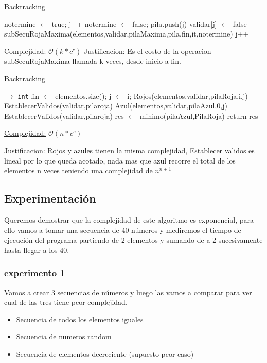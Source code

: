 \begin{algorithm}[H]
\caption{Backtracking}
\begin{algorithmic}[1]
    \State
    \State notermine $\gets$ true;
    \State {}
    \State j++
    \EndWhile
    \State {}
	\State	notermine $\gets$ false;
	\EndIf
    \State {}
    \State pila.push(j)
    \State validar[j] $\gets$ false
    \State subSecuRojaMaxima(elementos,validar,pilaMaxima,pila,fin,it,notermine)
    \State j++
    \EndWhile
\end{algorithmic}
\underline{Complejidad:} $\mathcal{O}(k*c^c)$
\underline{Justificacion:} Es el costo de la operacion subSecuRojaMaxima llamada k veces, desde inicio a fin.
\end{algorithm}



\begin{algorithm}[H]
\caption{Backtracking}
\begin{algorithmic}[1]
   $\to $ \texttt{int}
    \State fin $\gets$ elementos.size();
    \State j $\gets$ i;
    \State {}
    \State Rojos(elementos,validar,pilaRoja,i,j)
    \State EstablecerValidos(validar,pilaroja)
    \State Azul(elementos,validar,pilaAzul,0,j)
    \State EstablecerValidos(validar,pilaroja)
	\State	res $\gets$ minimo(pilaAzul,PilaRoja)
	\EndWhile
	\EndFor
\State return res
\end{algorithmic}
\underline{Complejidad:} $\mathcal{O}(n*c^c)$
\end{algorithm}
\underline{Justificacion:} Rojos y azules tienen la misma complejidad, Establecer validos es lineal por lo que queda acotado, nada mas que azul recorre el total de los elementos n veces teniendo una complejidad de $n^{n+1}$
\subsection{Experimentación}


Queremos demostrar que la complejidad de este algoritmo es exponencial, para ello vamos a tomar una secuencia de 40 números y mediremos el tiempo
de ejecución del programa partiendo de 2 elementos y sumando de a 2 sucesivamente hasta llegar a los 40.
\subsubsection {experimento 1}
Vamos a crear 3 secuencias de números y luego las vamos a comparar para ver cual de las tres tiene peor complejidad.
\begin{itemize}
\item Secuencia de todos los elementos iguales
\item Secuencia de numeros random
\item Secuencia de elementos decreciente (supuesto peor caso)
\end{itemize}

